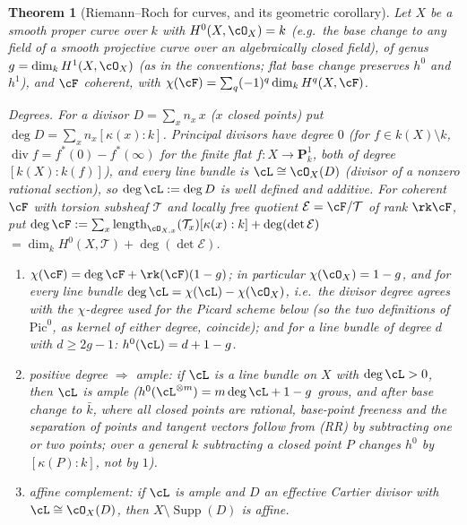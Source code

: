 \documentclass[11pt]{article}
\theoremstyle{plain}
\newtheorem{theorem}{Theorem}[section]
\theoremstyle{definition}
\newcommand{\Pic}{\mathrm{Pic}}
\begin{document}
\begin{theorem}[Riemann--Roch for curves, and its geometric corollary]
\label{thm:picard-rr}
Let $X$ be a smooth proper curve over $k$ with $H^0(X,\cO_X)=k$ (e.g.\
the base change to any field of a smooth projective curve over an
algebraically closed field), of genus $g=\dim_kH^1(X,\cO_X)$ (as in the
conventions; flat base change preserves $h^0$ and $h^1$), and $\cF$
coherent, with $\chi(\cF)=\sum_q(-1)^q\dim_kH^q(X,\cF)$.

\emph{Degrees.}  For a divisor $D=\sum_xn_x\,x$ ($x$ closed points)
put $\deg D=\sum_xn_x[\kappa(x):k]$.  Principal divisors have degree
$0$ (for $f\in k(X)\setminus k$, $\operatorname{div}f=f^*(0)-f^*(\infty)$
for the finite flat $f:X\to\mathbf P^1_k$, both of degree $[k(X):k(f)]$),
and every line bundle is $\cL\cong\cO_X(D)$ (divisor of a nonzero
rational section), so $\deg\cL:=\deg D$ is well defined and additive.
For coherent $\cF$ with torsion subsheaf $\mathcal T$ and locally free quotient
$\mathcal E=\cF/\mathcal T$ of rank $\rk\cF$, put
$\deg\cF:=\sum_x\operatorname{length}_{\cO_{X,x}}(\mathcal T_x)[\kappa(x):k]+\deg(\det\mathcal E)$
$=\dim_kH^0(X,\mathcal T)+\deg(\det\mathcal E)$.
\begin{enumerate}
\item[\textbf{(RR)}] $\chi(\cF)=\deg\cF+\rk(\cF)(1-g)$; in
particular $\chi(\cO_X)=1-g$, and for every line bundle
$\deg\cL=\chi(\cL)-\chi(\cO_X)$, i.e.\ the divisor degree agrees with
the $\chi$-degree used for the Picard scheme below (so the two
definitions of $\Pic^0$, as kernel of either degree, coincide); and
for a line bundle of degree $d$ with $d\ge2g-1$: $h^0(\cL)=d+1-g$.
\item[\textbf{(G)}] \emph{positive degree $\Rightarrow$ ample:} if
$\cL$ is a line bundle on $X$ with $\deg\cL>0$, then $\cL$ is ample
($h^0(\cL^{\otimes m})=m\deg\cL+1-g$ grows, and after base change to
$\bar k$, where all closed points are rational, base-point freeness and
the separation of points and tangent vectors follow from (RR) by
subtracting one or two points; over a general $k$ subtracting a closed
point $P$ changes $h^0$ by $[\kappa(P):k]$, not by $1$).
\item[\textbf{(H)}] \emph{affine complement:} if $\cL$ is ample
and $D$ an effective Cartier divisor with $\cL\cong\cO_X(D)$, then
$X\setminus\operatorname{Supp}(D)$ is affine.
\end{enumerate}
\end{theorem}
\end{document}
